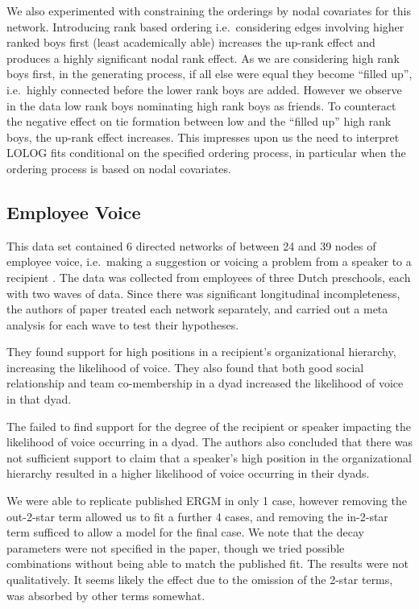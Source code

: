 \documentclass[
]{statsoc}
\begin{document}
We also experimented with constraining the orderings by nodal covariates
for this network. Introducing rank based ordering i.e.~considering edges
involving higher ranked boys first (least academically able) increases
the up-rank effect and produces a highly significant nodal rank effect.
As we are considering high rank boys first, in the generating process,
if all else were equal they become ``filled up'', i.e.~highly connected
before the lower rank boys are added. However we observe in the data low
rank boys nominating high rank boys as friends. To counteract the
negative effect on tie formation between low and the ``filled up'' high
rank boys, the up-rank effect increases. This impresses upon us the need
to interpret LOLOG fits conditional on the specified ordering process,
in particular when the ordering process is based on nodal covariates.

\subsection{Employee Voice}

This data set contained 6 directed networks of between 24 and 39 nodes
of employee voice, i.e.~making a suggestion or voicing a problem from a
speaker to a recipient \cite{Pauksktat2011}. The data was collected from
employees of three Dutch preschools, each with two waves of data. Since
there was significant longitudinal incompleteness, the authors of paper
treated each network separately, and carried out a meta analysis for
each wave to test their hypotheses.

They found support for high positions in a recipient's organizational
hierarchy, increasing the likelihood of voice. They also found that both
good social relationship and team co-membership in a dyad increased the
likelihood of voice in that dyad.

The failed to find support for the degree of the recipient or speaker
impacting the likelihood of voice occurring in a dyad. The authors also
concluded that there was not sufficient support to claim that a
speaker's high position in the organizational hierarchy resulted in a
higher likelihood of voice occurring in their dyads.

We were able to replicate published ERGM in only 1 case, however
removing the out-2-star term allowed us to fit a further 4 cases, and
removing the in-2-star term sufficed to allow a model for the final
case. We note that the decay parameters were not specified in the paper,
though we tried possible combinations without being able to match the
published fit. The results were not qualitatively. It seems likely the
effect due to the omission of the 2-star terms, was absorbed by other
terms somewhat.
\end{document}
